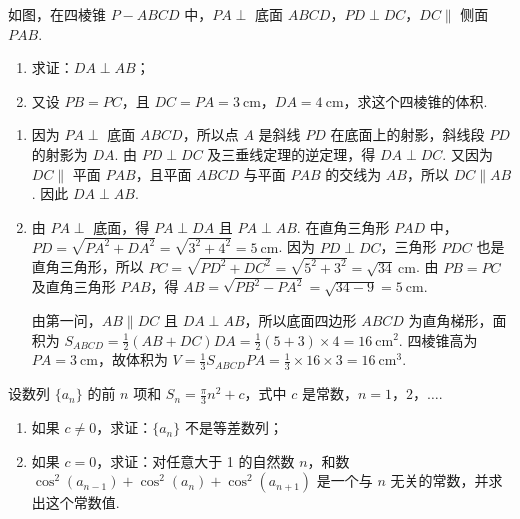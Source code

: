 \documentclass[UTF8,a4paper,oneside,11pt]{ctexbook}
\begin{document}
\begin{problem}
如图，在四棱锥 \(P - ABCD\) 中，\(PA \perp\) 底面 \(ABCD\)，\(PD \perp DC\)，\(DC \parallel\) 侧面 \(PAB\).

\begin{enumerate}
\item 求证：\(DA \perp AB\)；
\item 又设 \(PB = PC\)，且 \(DC = PA = 3\mathrm{~cm}\)，\(DA = 4\mathrm{~cm}\)，求这个四棱锥的体积.
\end{enumerate}

\end{problem}

\begin{solution}
\begin{enumerate}
\item 因为 \(PA\perp\) 底面 \(ABCD\)，所以点 \(A\) 是斜线 \(PD\) 在底面上的射影，斜线段 \(PD\) 的射影为 \(DA\). 由 \(PD\perp DC\) 及三垂线定理的逆定理，得 \(DA\perp DC\). 又因为 \(DC\parallel\) 平面 \(PAB\)，且平面 \(ABCD\) 与平面 \(PAB\) 的交线为 \(AB\)，所以 \(DC\parallel AB\). 因此 \(DA\perp AB\).
\item 由 \(PA\perp\) 底面，得 \(PA\perp DA\) 且 \(PA\perp AB\). 在直角三角形 \(PAD\) 中，\(PD=\sqrt{PA^2+DA^2}=\sqrt{3^2+4^2}=5\mathrm{~cm}\). 因为 \(PD\perp DC\)，三角形 \(PDC\) 也是直角三角形，所以 \(PC=\sqrt{PD^2+DC^2}=\sqrt{5^2+3^2}=\sqrt{34}\mathrm{~cm}\). 由 \(PB=PC\) 及直角三角形 \(PAB\)，得 \(AB=\sqrt{PB^2-PA^2}=\sqrt{34-9}=5\mathrm{~cm}\).

由第一问，\(AB\parallel DC\) 且 \(DA\perp AB\)，所以底面四边形 \(ABCD\) 为直角梯形，面积为 \(S_{ABCD}=\frac12(AB+DC)DA=\frac12(5+3)\times4=16\mathrm{~cm}^2\). 四棱锥高为 \(PA=3\mathrm{~cm}\)，故体积为 \(V=\frac13S_{ABCD}PA=\frac13\times16\times3=16\mathrm{~cm}^3\).
\end{enumerate}
\end{solution}

\begin{problem}
设数列 \(\{a_n\}\) 的前 \(n\) 项和 \(S_n = \frac{\pi}{3}n^2 + c\)，式中 \(c\) 是常数，\(n = 1\)，\(2\)，\(\dots\).
\begin{enumerate}
\item 如果 \(c \neq 0\)，求证：\(\{a_n\}\) 不是等差数列；
\item 如果 \(c = 0\)，求证：对任意大于 1 的自然数 \(n\)，和数 \(\cos^2(a_{n-1}) + \cos^2(a_n) + \cos^2(a_{n+1})\) 是一个与 \(n\) 无关的常数，并求出这个常数值.
\end{enumerate}
\end{problem}
\end{document}
